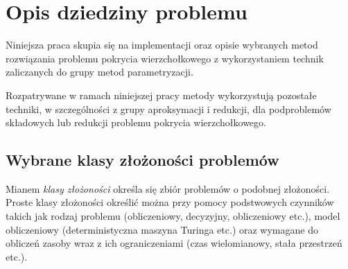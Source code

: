 \section{Opis dziedziny problemu}\label{Section_Domain}
\par{
  Niniejsza praca skupia się na implementacji oraz opisie wybranych metod 
  rozwiązania problemu pokrycia wierzchołkowego z wykorzystaniem technik
  zaliczanych do grupy metod parametryzacji.

  Rozpatrywane w ramach niniejszej pracy metody wykorzystują pozostałe techniki, w
  szczególności z grupy aproksymacji i redukcji, dla podproblemów składowych lub
  redukcji problemu pokrycia wierzchołkowego.
}
\subsection{Wybrane klasy złożoności problemów}\label{subsection_p_np}
\par{
  Mianem \emph{klasy złożoności} określa się zbiór problemów o podobnej
  złożoności. 
  Proste klasy złożoności określić można przy pomocy podstwowych czynników takich
  jak rodzaj problemu (obliczeniowy, decyzyjny, obliczeniowy etc.), model
  obliczeniowy (deterministyczna maszyna Turinga etc.) oraz wymagane do obliczeń
  zasoby wraz z ich ograniczeniami (czas wielomianowy, stała przestrzeń etc.).
}

